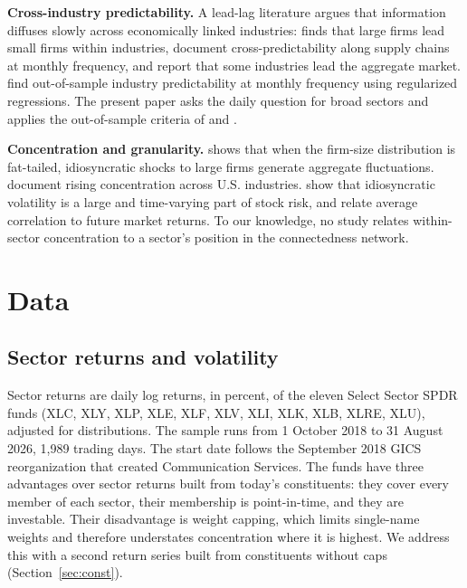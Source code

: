 \documentclass[11pt]{article}
\begin{document}
\textbf{Cross-industry predictability.} A lead-lag literature argues that information diffuses slowly across economically linked industries: \citet{hou2007} finds that large firms lead small firms within industries, \citet{menzly2010} document cross-predictability along supply chains at monthly frequency, and \citet{hong2007} report that some industries lead the aggregate market. \citet{rapach2019} find out-of-sample industry predictability at monthly frequency using regularized regressions. The present paper asks the daily question for broad sectors and applies the out-of-sample criteria of \citet{campbell2008} and \citet{clark2007}.

\textbf{Concentration and granularity.} \citet{gabaix2011} shows that when the firm-size distribution is fat-tailed, idiosyncratic shocks to large firms generate aggregate fluctuations. \citet{grullon2019} document rising concentration across U.S. industries. \citet{campbell2001} show that idiosyncratic volatility is a large and time-varying part of stock risk, and \citet{pollet2010} relate average correlation to future market returns. To our knowledge, no study relates within-sector concentration to a sector's position in the connectedness network.

\section{Data}\label{sec:data}

\subsection{Sector returns and volatility}

Sector returns are daily log returns, in percent, of the eleven Select Sector SPDR funds (XLC, XLY, XLP, XLE, XLF, XLV, XLI, XLK, XLB, XLRE, XLU), adjusted for distributions. The sample runs from 1 October 2018 to 31 August 2026, 1,989 trading days. The start date follows the September 2018 GICS reorganization that created Communication Services. The funds have three advantages over sector returns built from today's constituents: they cover every member of each sector, their membership is point-in-time, and they are investable. Their disadvantage is weight capping, which limits single-name weights and therefore understates concentration where it is highest. We address this with a second return series built from constituents without caps (Section~\ref{sec:const}).
\end{document}
